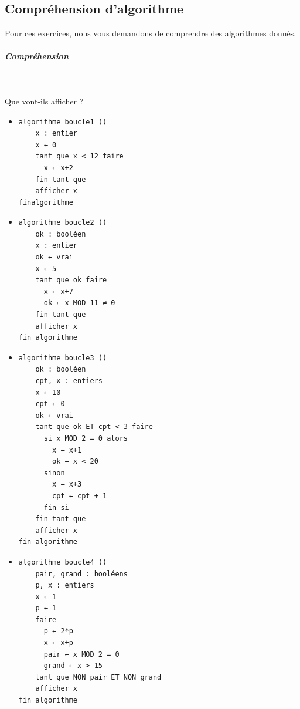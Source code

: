 \documentclass[11pt,a4paper]{article}
\begin{document}
            \par
        \subsection{Compr\'ehension d'algorithme}
          Pour ces exercices, nous vous demandons de comprendre des algorithmes donn\'es. 
          
			
		\subparagraph{Compr\'ehension} 
		
                \textcolor{white}{.} \par
            
							  Que vont-ils afficher ?
              
					\begin{itemize}
				
			\item \begin{verbatim}
algorithme boucle1 ()
    x : entier
    x ← 0
    tant que x < 12 faire
      x ← x+2
    fin tant que
    afficher x
finalgorithme
				\end{verbatim} \textcolor{gray}{\underline{\hspace*{2em}}} 
			\item \begin{verbatim}
algorithme boucle2 ()
    ok : booléen
    x : entier
    ok ← vrai
    x ← 5
    tant que ok faire
      x ← x+7
      ok ← x MOD 11 ≠ 0
    fin tant que
    afficher x
fin algorithme
				\end{verbatim} \textcolor{gray}{\underline{\hspace*{2em}}} 
			\item \begin{verbatim}
algorithme boucle3 ()
    ok : booléen
    cpt, x : entiers
    x ← 10
    cpt ← 0
    ok ← vrai
    tant que ok ET cpt < 3 faire
      si x MOD 2 = 0 alors
        x ← x+1
        ok ← x < 20
      sinon
        x ← x+3
        cpt ← cpt + 1
      fin si
    fin tant que
    afficher x
fin algorithme
				\end{verbatim} \textcolor{gray}{\underline{\hspace*{2em}}} 
			\item \begin{verbatim}
algorithme boucle4 ()
    pair, grand : booléens
    p, x : entiers
    x ← 1
    p ← 1
    faire
      p ← 2*p
      x ← x+p
      pair ← x MOD 2 = 0
      grand ← x > 15
    tant que NON pair ET NON grand
    afficher x
fin algorithme
				\end{verbatim} \textcolor{gray}{\underline{\hspace*{2em}}} 

\end{itemize}
\end{document}
